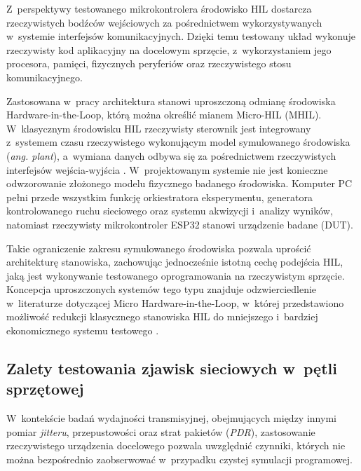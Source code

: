 Z~perspektywy testowanego mikrokontrolera środowisko HIL dostarcza rzeczywistych bodźców wejściowych za pośrednictwem wykorzystywanych w~systemie interfejsów komunikacyjnych.
Dzięki temu testowany układ wykonuje rzeczywisty kod aplikacyjny na docelowym sprzęcie, z~wykorzystaniem jego procesora, pamięci, fizycznych peryferiów oraz rzeczywistego stosu komunikacyjnego.

Zastosowana w~pracy architektura stanowi uproszczoną odmianę środowiska Hardware-in-the-Loop, którą można określić mianem Micro-HIL (MHIL).
W~klasycznym środowisku HIL rzeczywisty sterownik jest integrowany z~systemem czasu rzeczywistego wykonującym model symulowanego środowiska (\textit{ang. plant}), a~wymiana danych odbywa się za pośrednictwem rzeczywistych interfejsów wejścia-wyjścia \cite{mathworks_hil}.
W~projektowanym systemie nie jest konieczne odwzorowanie złożonego modelu fizycznego badanego środowiska.
Komputer PC pełni przede wszystkim funkcję orkiestratora eksperymentu, generatora kontrolowanego ruchu sieciowego oraz systemu akwizycji i~analizy wyników, natomiast rzeczywisty mikrokontroler ESP32 stanowi urządzenie badane (DUT).

Takie ograniczenie zakresu symulowanego środowiska pozwala uprościć architekturę stanowiska, zachowując jednocześnie istotną cechę podejścia HIL, jaką jest wykonywanie testowanego oprogramowania na rzeczywistym sprzęcie.
Koncepcja uproszczonych systemów tego typu znajduje odzwierciedlenie w~literaturze dotyczącej Micro Hardware-in-the-Loop, w~której przedstawiono możliwość redukcji klasycznego stanowiska HIL do mniejszego i~bardziej ekonomicznego systemu testowego \cite{palladino2009micro}.

\subsection{Zalety testowania zjawisk sieciowych w~pętli sprzętowej}

W~kontekście badań wydajności transmisyjnej, obejmujących między innymi pomiar \textit{jitteru}, przepustowości oraz strat pakietów (\textit{PDR}), zastosowanie rzeczywistego urządzenia docelowego pozwala uwzględnić czynniki, których nie można bezpośrednio zaobserwować w~przypadku czystej symulacji programowej.


